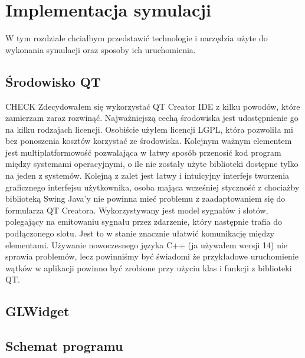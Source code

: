 \chapter{Implementacja symulacji}
\label{cha:implementacja}
W tym rozdziale chciałbym przedstawić technologie i narzędzia użyte do wykonania symulacji oraz sposoby ich uruchomienia.

\section{Środowisko QT}
\label{sec:qt}
{\color{red} CHECK}
Zdecydowałem się wykorzystać QT Creator IDE z kilku powodów, które zamierzam zaraz rozwinąć. Najważniejszą cechą środowiska jest udostępnienie go na kilku rodzajach licencji. Osobiście użyłem licencji LGPL, która pozwoliła mi bez ponoszenia kosztów korzystać ze środowiska. Kolejnym ważnym elementem jest multiplatformowość pozwalająca w łatwy sposób przenosić kod program między systemami operacyjnymi, o ile nie zostały użyte biblioteki dostępne tylko na jeden z systemów. Kolejną z zalet jest łatwy i intuicyjny interfejs tworzenia graficznego interfejsu użytkownika, osoba mająca wcześniej styczność z chociażby biblioteką Swing Java'y nie powinna mieć problemu z zaadaptowaniem się do  formularza QT Creatora. Wykorzystywany jest model sygnałów i slotów, polegający na emitowaniu sygnału przez zdarzenie, który następnie trafia do podłączonego slotu. Jest to w stanie znacznie ułatwić komunikację między elementami. Używanie nowoczesnego języka C++ (ja używałem wersji 14) nie sprawia problemów, lecz powinniśmy być świadomi że przykładowe uruchomienie wątków w aplikacji powinno być zrobione przy użyciu klas i funkcji z biblioteki QT.


\section{GLWidget}
\label{sec:glwidget}


\section{Schemat programu}
\label{sec::schemat}


